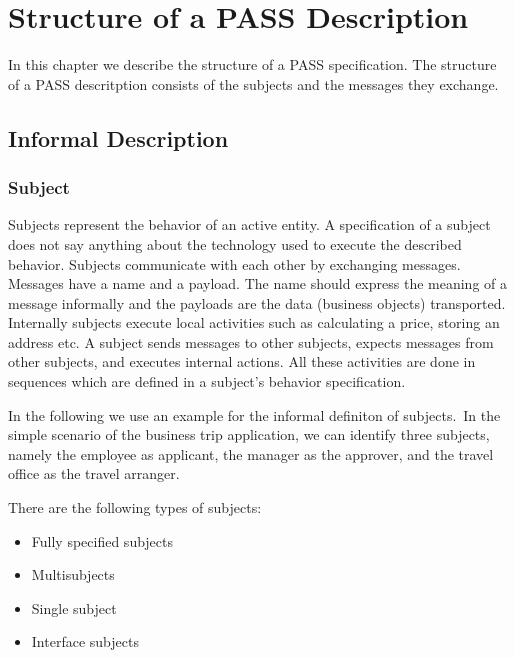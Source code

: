 \chapter{Structure of a PASS Description}
	In this chapter we describe the structure of a PASS specification. The structure of a PASS descritption consists of the subjects and the messages they exchange.

\section{Informal Description}
\subsection{Subject}
\label{sec: Subject}

Subjects represent the behavior of an active entity. A specification of a subject does not say anything about the technology used to execute the described behavior. 
Subjects communicate with each other by exchanging messages. Messages have a name and a payload. The name should express the meaning of a message informally and the payloads are the data (business objects) transported. Internally subjects execute local activities such as calculating a price, storing an address etc.
A subject sends messages to other subjects, expects messages from other subjects, and executes internal actions. All these activities are done in sequences which are defined in a subject's behavior specification.

In the following we use an example for the informal definiton of subjects.\
In the simple scenario of the business trip application, we can identify three subjects, namely the employee as applicant, the manager as the approver, and the travel office as the travel arranger.

There are the following types of subjects:
\begin{itemize}
	\item Fully specified subjects 
	\item Multisubjects 
	\item Single subject
	\item Interface subjects 
\end{itemize}

